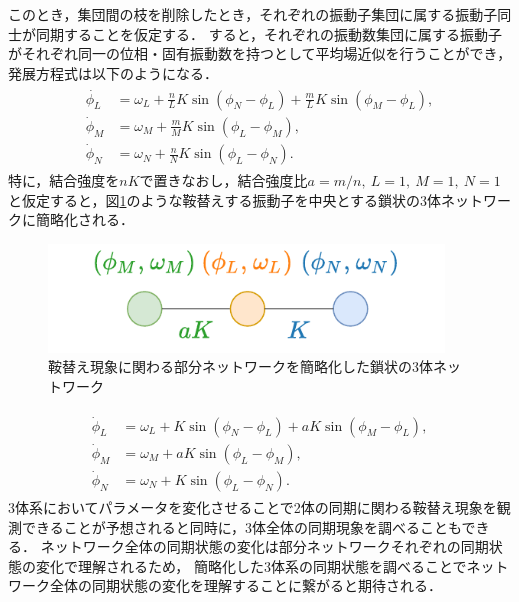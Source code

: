 \documentclass[../main]{subfiles}
\begin{document}
このとき，集団間の枝を削除したとき，それぞれの振動子集団に属する振動子同士が同期することを仮定する．
すると，それぞれの振動数集団に属する振動子がそれぞれ同一の位相・固有振動数を持つとして平均場近似を行うことができ，発展方程式は以下のようになる．
\begin{align}
    \label{eq:3body-default}
    \begin{split}
        \dot{\phi_L}&=\omega_L+\frac{n}{L}K\sin\left( \phi_N-\phi_L \right)+\frac{m}{L}K\sin\left( \phi_M-\phi_L \right),\\
        \dot{\phi}_M&=\omega_M+\frac{m}{M}K\sin\left( \phi_L-\phi_M \right), \\
        \dot{\phi}_N&=\omega_N+\frac{n}{N}K\sin\left( \phi_L-\phi_N \right).    
    \end{split}
\end{align}
特に，結合強度を$nK$で置きなおし，結合強度比$a=m/n,\ L=1,\ M=1,\ N=1$と仮定すると，図\ref{fig:3body}のような鞍替えする振動子を中央とする鎖状の3体ネットワークに簡略化される．

\begin{figure}[tbp]
    \centering
    \includegraphics[width=105mm]{./images/three_obj_after.pdf}
    \centering
    \caption{鞍替え現象に関わる部分ネットワークを簡略化した鎖状の3体ネットワーク}
    \label{fig:3body}
\end{figure}

\begin{align}
    \label{eq:3body}
    \begin{split}
        \dot{\phi}_L&=\omega_L+K\sin\left( \phi_N-\phi_L \right)+aK\sin\left( \phi_M-\phi_L \right),\\
        \dot{\phi}_M&=\omega_M+aK\sin\left( \phi_L-\phi_M \right), \\
        \dot{\phi}_N&=\omega_N+K\sin\left( \phi_L-\phi_N \right).    
    \end{split}
\end{align}
3体系においてパラメータを変化させることで2体の同期に関わる鞍替え現象を観測できることが予想されると同時に，3体全体の同期現象を調べることもできる．
ネットワーク全体の同期状態の変化は部分ネットワークそれぞれの同期状態の変化で理解されるため，
簡略化した3体系の同期状態を調べることでネットワーク全体の同期状態の変化を理解することに繋がると期待される．
\end{document}
